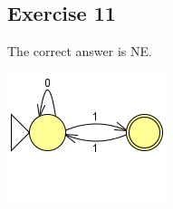 {\subsection{Exercise 11}
The correct answer is NE.
\begin{center} \includegraphics[scale=0.5]{TP05_11} \end{center}
}
